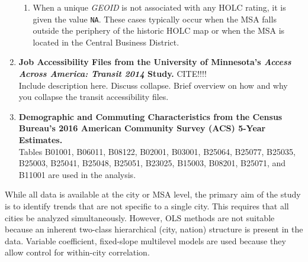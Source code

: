 \documentclass[paper=letter, fontsize=12pt]{scrartcl} %
\begin{document}
\begin{enumerate}
\begin{enumerate}
		\item When a unique \textit{GEOID} is not associated with any HOLC rating, it is given the value \texttt{NA}. These cases typically occur when the MSA falls outside the periphery of the historic HOLC map or when the MSA is located in the Central Business District.
	\end{enumerate}
	\item \textbf{Job Accessibility Files from the University of Minnesota's \textit{Access Across America: Transit 2014} Study.} CITE!!!! \\
	Include description here. Discuss collapse. Brief overview on how and why you collapse the transit accessibility files.
	\item \textbf{Demographic and Commuting Characteristics from the Census Bureau's 2016 American Community Survey (ACS) 5-Year Estimates.} \cite{acs16}\\
	Tables B01001, B06011, B08122, B02001, B03001, B25064, B25077, B25035, B25003, B25041, B25048, B25051, B23025, B15003, B08201, B25071, and B11001 are used in the analysis.
\end{enumerate}
While all data is available at the city or MSA level, the primary aim of the study is to identify trends that are not specific to a single city. This requires that all cities be analyzed simultaneously. However, OLS methods are not suitable because an inherent two-class hierarchical (city, nation) structure is present in the data. Variable coefficient, fixed-slope multilevel models are used because they allow control for within-city correlation.

\clearpage
\end{document}
